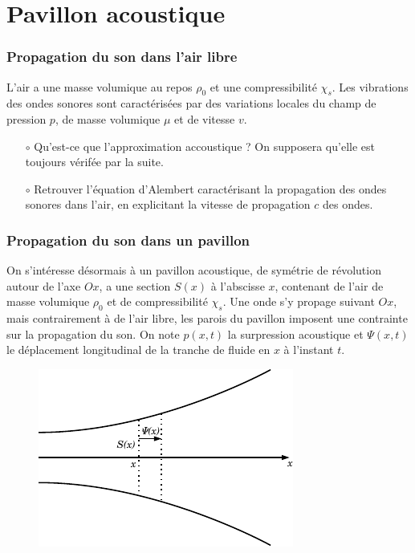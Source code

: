 \documentclass{report}
\begin{document}
\newpage

\section*{Pavillon acoustique}

\subsubsection{Propagation du son dans l'air libre}

L'air a une masse volumique au repos $\rho_0$ et une compressibilité $\chi_s$. Les vibrations des ondes sonores sont caractérisées par des variations locales du champ de pression $p$, de masse volumique $\mu$ et de vitesse $v$. 

\begin{itemize}

	\item[$\circ$] Qu'est-ce que l'approximation accoustique ? On supposera qu'elle est toujours vérifée par la suite.

	\item[$\circ$]  Retrouver l'équation d'Alembert caractérisant la propagation des ondes sonores dans l'air, en explicitant la vitesse de propagation $c$ des ondes.

\end{itemize}

\subsubsection{Propagation du son dans un pavillon}

On s'intéresse désormais à un pavillon acoustique, de symétrie de révolution autour de l'axe $Ox$, a une section $S(x)$ à l'abscisse $x$, contenant de l'air de masse volumique $\rho_0$ et de compressibilité $\chi_s$. Une onde s'y propage suivant $Ox$, mais contrairement à de l'air libre, les parois du pavillon imposent une contrainte sur la propagation du son. On note $p(x,t)$ la surpression acoustique et $\Psi(x,t)$ le déplacement longitudinal de la tranche de fluide en $x$ à l'instant $t$. 

\begin{figure}[h!]
\centering
		\includegraphics[scale=1.2]{onde_pavillon.pdf}
\end{figure}
\end{document}
